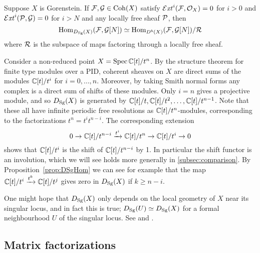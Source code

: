 \begin{proposition}[label=prop:DSgHom]{\cite[Prop 1.21]{OrlovSingularities}}{}
    Suppose $X$ is Gorenstein. If $\mathcal{F},\mathcal{G}\in\operatorname{Coh}(X)$ satisfy
    $\operatorname{\mathcal{E}\mathit{xt}}^i(\mathcal{F},\mathcal{O}_X)=0$ for $i>0$ and $\operatorname{\mathcal{E}\mathit{xt}}^i(\mathcal{P},\mathcal{G})=0$ for $i>N$ and
    any locally free sheaf $\mathcal{P}$, then
    \begin{equation*}
        \operatorname{Hom}_{D_{\mathrm{Sg}}(X)}(\mathcal{F},\mathcal{G}[N])
            \simeq \operatorname{Hom}_{D^b(X)}(\mathcal{F},\mathcal{G}[N])/\mathcal{R}
    \end{equation*}
    where $\mathcal{R}$ is the subspace of maps factoring through a locally free
    sheaf.
\end{proposition}

\begin{example}[label=ex:nonreducedpoint]{}{}
    Consider a non-reduced point $X=\operatorname{Spec}\mathbb{C}[t]/t^n$. By the structure theorem
    for finite type modules over a PID, coherent sheaves on $X$ are direct sums
    of the modules $\mathbb{C}[t]/t^i$ for $i=0,\ldots,n$. Moreover, by taking Smith
    normal forms any complex is a direct sum of shifts of these modules. Only
    $i=n$ gives a projective module, and so $D_{\mathrm{Sg}}(X)$ is generated by
    $\mathbb{C}[t]/t,\mathbb{C}[t]/t^2,\ldots,\mathbb{C}[t]/t^{n-1}$. Note that these all have infinite
    periodic free resolutions as $\mathbb{C}[t]/t^n$-modules, corresponding to the
    factorizations $t^n=t^it^{n-i}$. The corresponding extension
    \begin{equation*}
        0 \to \mathbb{C}[t]/t^{n-i} \xrightarrow{t^i} \mathbb{C}[t]/t^n \to \mathbb{C}[t]/t^i \to 0
    \end{equation*}
    shows that $\mathbb{C}[t]/t^i$ is the shift of $\mathbb{C}[t]/t^{n-i}$ by 1. In particular
    the shift functor is an involution, which we will see holds more generally
    in \ref{subsec:comparison}. By Proposition~\ref{prop:DSgHom} we can see for
    example that the map $\mathbb{C}[t]/t^i\xrightarrow{t^k}\mathbb{C}[t]/t^j$ gives zero in
    $D_{\mathrm{Sg}}(X)$ if $k\ge n-i$.
\end{example}

One might hope that $D_{\mathrm{Sg}}(X)$ only depends on the local geometry of $X$ near
its singular locus, and in fact this is true; $D_{\mathrm{Sg}}(U)\simeq D_{\mathrm{Sg}}(X)$ for a
formal neighbourhood $U$ of the singular locus. See
\cite[Prop~1.14]{OrlovSingularities} and \cite[\S6]{Shipman}.

\subsection{Matrix factorizations}

